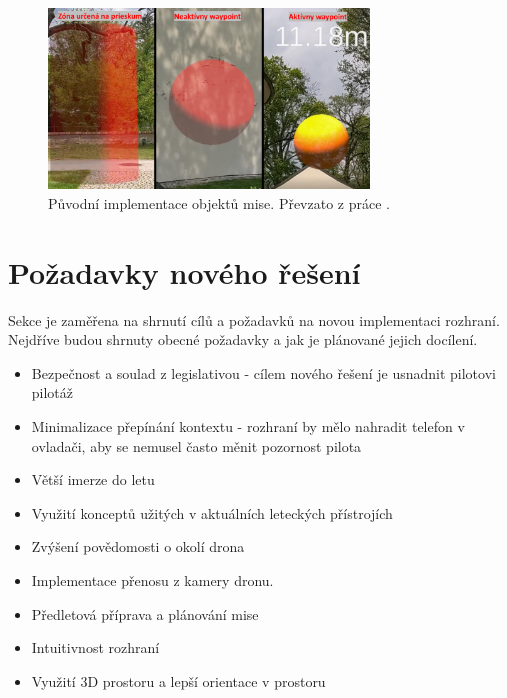 \begin{figure}[ht]
	\centering
	\includegraphics[width=0.76\textwidth]{obrazky-figures/navrh/prevMisionObject.pdf}
	\caption{Původní implementace objektů mise. Převzato z práce \cite{KyjacMartin2022Vnpp}.}
	\label{pic:prevMisionObject}
\end{figure}

\section{Požadavky nového řešení}
Sekce je zaměřena na shrnutí cílů a požadavků na novou implementaci rozhraní. Nejdříve budou shrnuty obecné požadavky a jak je plánované jejich docílení. 

\begin{itemize}
    \item Bezpečnost a soulad z legislativou - cílem nového řešení je usnadnit pilotovi pilotáž 
    
    \item Minimalizace přepínání kontextu - rozhraní by mělo nahradit telefon v ovladači, aby se nemusel často měnit pozornost pilota

    \item Větší imerze do letu
    
    \item Využití konceptů užitých v aktuálních leteckých přístrojích 
    
    \item Zvýšení povědomosti o okolí drona
    
    \item Implementace přenosu z kamery dronu.
    
    \item Předletová příprava a plánování mise 
    
    \item Intuitivnost rozhraní

    
    
    \item Využití 3D prostoru a lepší orientace v prostoru
    
\end{itemize}

